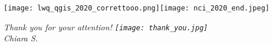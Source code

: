 \documentclass{beamer}
\begin{document}
\begin{frame}%

\texttt{[image: lwq\_qgis\_2020\_correttooo.png]}\texttt{[image: nci\_2020\_end.jpeg]}
\end{frame}

\begin{frame}
\itshape{\Large{Thank you for your attention!}}
\smallskip
\centering
\texttt{[image: thank\_you.jpg]}\\
\smallskip
\footnotesize{Chiara S.}
\end{frame}
\end{document}
